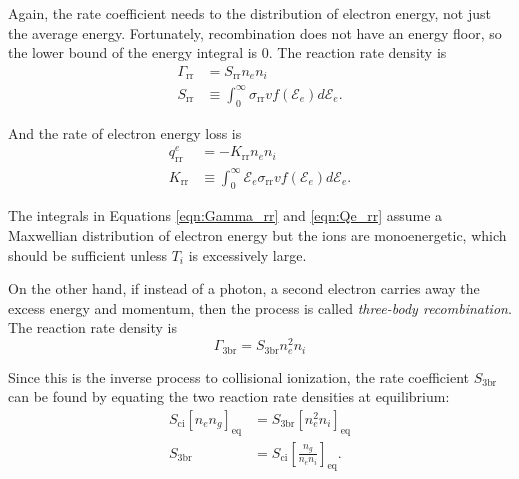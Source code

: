 Again, the rate coefficient needs to the distribution of electron energy, not just the average energy. Fortunately, recombination does not have an energy floor, so the lower bound of the energy integral is 0.
The reaction rate density is
\begin{subequations}
    \label{eqn:Gamma_rr}
    \begin{align}
        \Gamma_{\text{rr}} &= S_{\text{rr}} n_e n_i \\
        S_{\text{rr}} &\equiv \int_0^{\infty} \sigma_{\text{rr}} v f(\mathcal{E}_e) d\mathcal{E}_e.
    \end{align}    
\end{subequations}

And the rate of electron energy loss is
\begin{subequations}
    \label{eqn:Qe_rr}
    \begin{align}
        q^e_{\text{rr}} &= -K_{\text{rr}} n_e n_i \\
        K_{\text{rr}} &\equiv \int_0^{\infty} \mathcal{E}_e \sigma_{\text{rr}} v f(\mathcal{E}_e) d\mathcal{E}_e.
    \end{align}    
\end{subequations}

The integrals in Equations \ref{eqn:Gamma_rr} and \ref{eqn:Qe_rr} assume a Maxwellian distribution of electron energy but the ions are monoenergetic, which should be sufficient unless $T_i$ is excessively large.

On the other hand, if instead of a photon, a second electron carries away the excess energy and momentum, then the process is called \textit{three-body recombination}. The reaction rate density is
\begin{equation}
    \Gamma_{\text{3br}} = S_{\text{3br}} n_e^2 n_i
    \label{eqn:Gamma_3br}
\end{equation}

Since this is the inverse process to collisional ionization, the rate coefficient $S_{\text{3br}}$ can be found by equating the two reaction rate densities at equilibrium:
\begin{subequations}
    \label{eqn:S_3br}
    \begin{align}
        S_{\text{ci}} \left[ n_e n_g \right]_{\text{eq}} &= S_{\text{3br}} \left[ n_e^2 n_i \right]_{\text{eq}} \\
        S_{\text{3br}} &= S_{\text{ci}} \left[ \frac{n_g}{n_e n_i} \right]_{\text{eq}}.
    \end{align}
\end{subequations}

